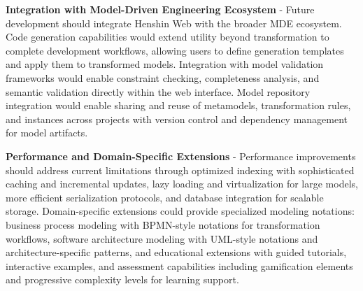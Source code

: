   \textbf{Integration with Model-Driven Engineering Ecosystem} - Future development should integrate Henshin Web with the broader MDE ecosystem. Code generation capabilities would extend utility beyond transformation to complete development workflows, allowing users to define generation templates and apply them to transformed models. Integration with model validation frameworks would enable constraint checking, completeness analysis, and semantic validation directly within the web interface. Model repository integration would enable sharing and reuse of metamodels, transformation rules, and instances across projects with version control and dependency management for model artifacts.

  \textbf{Performance and Domain-Specific Extensions} - Performance improvements should address current limitations through optimized indexing with sophisticated caching and incremental updates, lazy loading and virtualization for large models, more efficient serialization protocols, and database integration for scalable storage. Domain-specific extensions could provide specialized modeling notations: business process modeling with BPMN-style notations for transformation workflows, software architecture modeling with UML-style notations and architecture-specific patterns, and educational extensions with guided tutorials, interactive examples, and assessment capabilities including gamification elements and progressive complexity levels for learning support.
